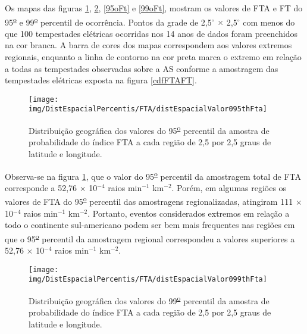 
Os mapas das figuras \ref{95oFta}, \ref{99oFta}, \ref{95oFt}  e \ref{99oFt}, mostram os valores de FTA e FT do 95\textsuperscript{\underline{o}} e 99\textsuperscript{\underline{o}} percentil de ocorrência. Pontos da grade de 2,5$^{\circ}$ $\times$ 2,5$^{\circ}$ com menos do que 100 tempestades elétricas ocorridas nos 14 anos de dados foram preenchidos na cor branca. A barra de cores dos mapas correspondem aos valores extremos regionais, enquanto a linha de contorno na cor preta marca o extremo em relação a todas as tempestades observadas sobre a AS conforme a amostragem das tempestades elétricas exposta na figura \ref{cdfFTAFT}.

\begin{figure}[!ht]
\centering
{\texttt{[image: img/DistEspacialPercentis/FTA/distEspacialValor095thFta]}} 
\caption{Distribuição geográfica dos valores do 95\textsuperscript{\underline{o}} percentil da amostra de probabilidade do índice FTA a cada região de 2,5 por 2,5 graus de latitude e longitude.}
\label{95oFta}
\end{figure}

Observa-se na figura \ref{95oFta}, que o valor do 95\textsuperscript{\underline{o}} percentil da amostragem total de FTA corresponde a 52,76 $\times$ 10$^{-4}$ raios min$^{-1}$
km$^{-2}$. Porém, em algumas regiões os valores de FTA do 95\textsuperscript{\underline{o}} percentil das amostragens regionalizadas, atingiram  111 $\times$ 10$^{-4}$ raios min$^{-1}$ km$^{-2}$. Portanto, eventos considerados extremos em relação a todo o continente sul-americano podem ser bem mais frequentes nas regiões em que o 95\textsuperscript{\underline{o}} percentil da amostragem regional correspondeu a valores superiores a 52,76 $\times$ 10$^{-4}$ raios min$^{-1}$ km$^{-2}$.
  
\begin{figure}[!ht]
\centering  
{\texttt{[image: img/DistEspacialPercentis/FTA/distEspacialValor099thFta]}}
\caption{Distribuição geográfica dos valores do  99\textsuperscript{\underline{o}} percentil da amostra de probabilidade do índice FTA a cada região de 2,5 por 2,5 graus de latitude e longitude.}
\label{99oFta}
\end{figure} 

